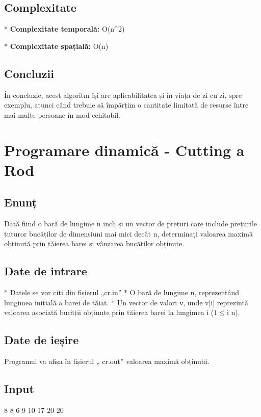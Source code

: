 \documentclass[runningheads]{llncs}
\begin{document}
\subsection{Complexitate}

* { \bfseries Complexitate temporală:} O(n^2) \newline

* {\bfseries Complexitate spațială:} O(n) \newline
\subsection{Concluzii}
În concluzie, acest algoritm își are aplicabilitatea și în viața de zi cu zi, spre 				exemplu, atunci când trebuie să împărțim o cantitate limitată de resurse între 				mai multe persoane în mod echitabil. 



\section{Programare dinamică - Cutting a Rod}

\subsection{Enunț}

Dată fiind o bară de lungime n inch și un vector de prețuri care include 					prețurile tuturor bucăților de dimensiuni mai mici decât n, determinați 					valoarea maximă obținută prin tăierea barei și vânzarea bucăților obținute.

\subsection{Date de intrare}

* Datele se vor citi din fișierul „cr.in”\newline
*  O bară de lungime n, reprezentând lungimea inițială a barei de tăiat.\newline
* Un vector de valori v, unde v[i] reprezintă valoarea asociată bucății obținute prin tăierea barei la lungimea i ($1 \le $i \le n).


\subsection{Date de ieșire}
Programul va afișa în fișierul „ cr.out” valoarea maximă obținută.
\subsection{Input}
8 8 6 9 10 17 20 20
			
\end{document}

